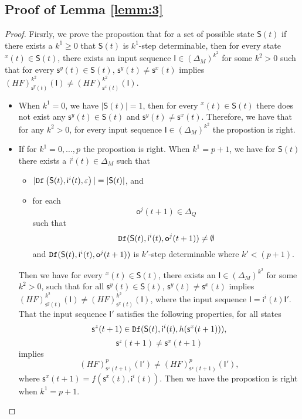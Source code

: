 \begin{appendices}
\subsection{Proof of Lemma \ref{lemm:3}}
\begin{proof} Firsrly, we prove the propostion that for a set of possible state $\mathsf{S}(t)$ if there exists a $k^{1}\ge 0$ that $\mathsf{S}(t)$ is $k^{1}$-step determinable, then for every state \State$^{x}(t)\in \mathsf{S}(t)$, there exists an input sequence $\mathsf{I}\in(\Delta_M)^{k^2}$ for some $k^2 >0$ such that for every $\mathsf{s}^{y}(t)\in \mathsf{S}(t)$, $\mathsf{s}^{y}(t)\neq \mathsf{s}^{x}(t)$ implies $(HF)^{k^2}_{\mathsf{s}^{y}(t)}(\mathsf{I})\neq (HF)^{k^2}_{{\mathsf{s}^{x}(t)}}(\mathsf{I})$.
\begin{itemize}
\item When $k^{1}=0$, we have $|\mathsf{S}(t)|=1$, then for every \State$^{x}(t)$$\in \mathsf{S}(t)$ there does not exist any $\mathsf{s}^{y}(t)\in \mathsf{S}(t)$ and $\mathsf{s}^{y}(t)\neq \mathsf{s}^{x}(t)$. Therefore, we have that for any $k^2 >0$, for every input sequence $\mathsf{I}\in(\Delta_M)^{k^2}$ the propostion is right. 
\item If for $k^{1}=0,\ldots, p$ the propostion is right. When $k^{1}=p+1$, we have for $\mathsf{S}(t)$ there exists a $\mathsf{i}^{i}(t)\in \Delta_M$ such that
 \begin{itemize}
 \item  $|{\tt Df}\left(\mathsf{S}(t),\mathsf{i}^{i}(t),\varepsilon\right)|=|\mathsf{S}(t)|$, and 
 \item  for each \[\mathsf{o}^{j}(t+1)\in \Delta_Q\] such that \[{\tt Df}(\mathsf{S}(t),\mathsf{i}^{i}(t),\mathsf{o}^{j}(t+1))\neq \emptyset\] and ${\tt Df}(\mathsf{S}(t),\mathsf{i}^{i}(t),\mathsf{o}^{j}(t+1))$ is $k'$-step determinable where ${k'}<(p+1)$.
 \end{itemize}
 Then we have for every \State$^{x}(t)$$\in \mathsf{S}(t)$, there exists an $\mathsf{I}\in(\Delta_M)^{k^2}$ for some $k^2 >0$, such that for all $\mathsf{s}^{y}(t)\in \mathsf{S}(t)$, $\mathsf{s}^{y}(t)\neq \mathsf{s}^{x}(t)$ implies $(HF)^{k^2}_{\mathsf{s}^{y}(t)}(\mathsf{I})\neq (HF)^{k^2}_{{\mathsf{s}^{x}(t)}}(\mathsf{I})$, where the input sequence $\mathsf{I}=\mathsf{i}^{i}(t)\mathsf{I}'$. That the input sequence $\mathsf{I}'$ satisfies the following properties,
  for all states \[\mathsf{s}^{z}(t+1)\in {\tt Df}(\mathsf{S}(t),\mathsf{i}^{i}(t),h(\mathsf{s}^{x}(t+1))),\]\[\mathsf{s}^{z}(t+1)\neq \mathsf{s}^{x}(t+1)\] implies \[(HF)^p_{\mathsf{s}^{z}(t+1)}(\mathsf{I}')\neq (HF)^p_{{\mathsf{s}^{x}(t+1)}}(\mathsf{I}'),\] where $\mathsf{s}^{x}(t+1)=f(\mathsf{s}^{x}(t),\mathsf{i}^{i}(t))$. Then we have the propostion is right when $k^{1}=p+1$. 


\end{itemize}
\end{proof}
\end{appendices}
